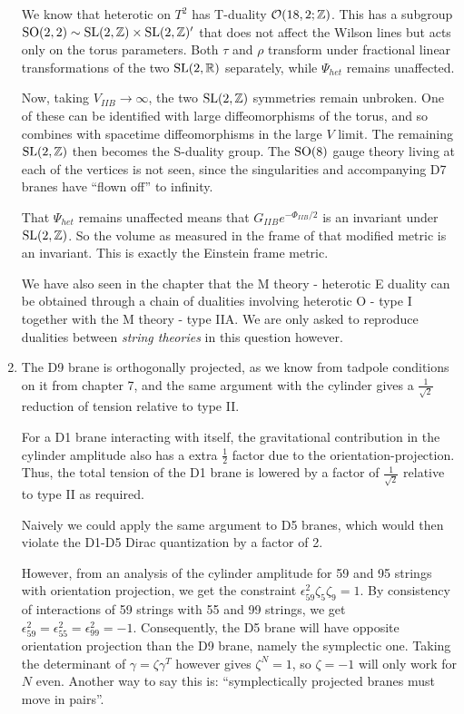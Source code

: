 \documentclass[11pt, class=article, crop=false]{standalone}
\begin{document}
\begin{enumerate}
	We know that heterotic on $T^2$ has T-duality $\mathcal{O}(18, 2; \mathbb{Z})$. This has a subgroup $\mathrm{SO}(2,2) \sim \mathrm{SL}(2, \mathbb{Z}) \times \mathrm{SL}(2, \mathbb{Z})'$ that does not affect the Wilson lines but acts only on the torus parameters. Both $\tau$ and $\rho$ transform under fractional linear transformations of the two $\mathrm{SL}(2, \mathbb{R})$ separately, while $\Psi_{het}$ remains unaffected.
	
	Now, taking $V_{IIB} \to \infty$, the two $\mathrm{SL}(2, \mathbb{Z})$ symmetries remain unbroken. One of these can be identified with large diffeomorphisms of the torus, and so combines with spacetime diffeomorphisms in the large $V$ limit. The remaining $\mathrm{SL}(2, \mathbb{Z})$ then becomes the S-duality group. The $\mathrm{SO}(8)$ gauge theory living at each of the vertices is not seen, since the singularities and accompanying D7 branes have ``flown off'' to infinity. 
	
	That $\Psi_{het}$ remains unaffected means that $G_{IIB} e^{-\Phi_{IIB}/2}$ is an invariant under $\mathrm{SL}(2, \mathbb{Z})$. So the volume as measured in the frame of that modified metric is an invariant. This is exactly the Einstein frame metric. 
	
	We have also seen in the chapter that the M theory - heterotic E duality can be obtained through a chain of dualities involving heterotic O - type I together with the M theory - type IIA. We are only asked to reproduce dualities between \emph{string theories} in this question however. 
	
	\item The D9 brane is orthogonally projected, as we know from tadpole conditions on it from chapter 7, and the same argument with the cylinder gives a $\frac{1}{\sqrt2}$ reduction of tension relative to type II. 
	
	For a D1 brane interacting with itself, the gravitational contribution in the cylinder amplitude also has a extra $\frac12$ factor due to the orientation-projection. Thus, the total tension of the D1 brane is lowered by a factor of $\frac1{\sqrt{2}}$ relative to type II as required. 
	
	Naively we could apply the same argument to D5 branes, which would then violate the D1-D5 Dirac quantization by a factor of 2.
	
	However, from an analysis of the cylinder amplitude for 59 and 95 strings with orientation projection, we get the constraint $\epsilon^2_{59} \zeta_5 \zeta_9 = 1$. By consistency of interactions of 59 strings with 55 and 99 strings, we get $\epsilon_{59}^2 = \epsilon_{55}^2 = \epsilon_{99}^2 = -1$. Consequently, the D5 brane will have opposite orientation projection than the D9 brane, namely the symplectic one. Taking the determinant of $\gamma = \zeta \gamma^T$ however gives $\zeta^N = 1$, so $\zeta = -1$ will only work for $N$ even. Another way to say this is: ``symplectically projected branes must move in pairs''. 
	

\end{enumerate}
\end{document}
